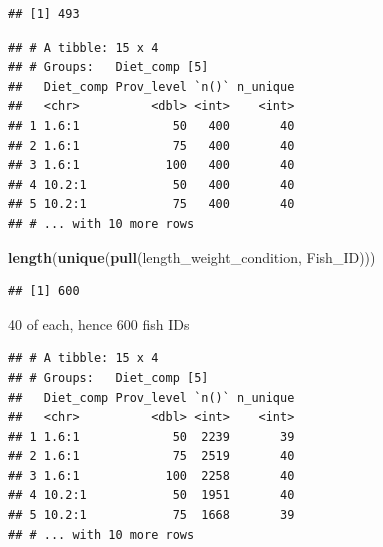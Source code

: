 \documentclass[]{book}
\newenvironment{Shaded}{\begin{snugshade}}{\end{snugshade}}
\newcommand{\DataTypeTok}[1]{\textcolor[rgb]{0.13,0.29,0.53}{#1}}
\newcommand{\KeywordTok}[1]{\textcolor[rgb]{0.13,0.29,0.53}{\textbf{#1}}}
\newcommand{\NormalTok}[1]{#1}
\newcommand{\OperatorTok}[1]{\textcolor[rgb]{0.81,0.36,0.00}{\textbf{#1}}}
\newcommand{\StringTok}[1]{\textcolor[rgb]{0.31,0.60,0.02}{#1}}
\begin{document}
\begin{verbatim}
## [1] 493
\end{verbatim}

\begin{Shaded}
\end{Shaded}

\begin{verbatim}
## # A tibble: 15 x 4
## # Groups:   Diet_comp [5]
##   Diet_comp Prov_level `n()` n_unique
##   <chr>          <dbl> <int>    <int>
## 1 1.6:1             50   400       40
## 2 1.6:1             75   400       40
## 3 1.6:1            100   400       40
## 4 10.2:1            50   400       40
## 5 10.2:1            75   400       40
## # ... with 10 more rows
\end{verbatim}

\begin{Shaded}
\begin{Highlighting}[]
\KeywordTok{length}\NormalTok{(}\KeywordTok{unique}\NormalTok{(}\KeywordTok{pull}\NormalTok{(length_weight_condition, Fish_ID)))}
\end{Highlighting}
\end{Shaded}

\begin{verbatim}
## [1] 600
\end{verbatim}

40 of each, hence 600 fish IDs

\begin{Shaded}
\end{Shaded}

\begin{verbatim}
## # A tibble: 15 x 4
## # Groups:   Diet_comp [5]
##   Diet_comp Prov_level `n()` n_unique
##   <chr>          <dbl> <int>    <int>
## 1 1.6:1             50  2239       39
## 2 1.6:1             75  2519       40
## 3 1.6:1            100  2258       40
## 4 10.2:1            50  1951       40
## 5 10.2:1            75  1668       39
## # ... with 10 more rows
\end{verbatim}
\end{document}
